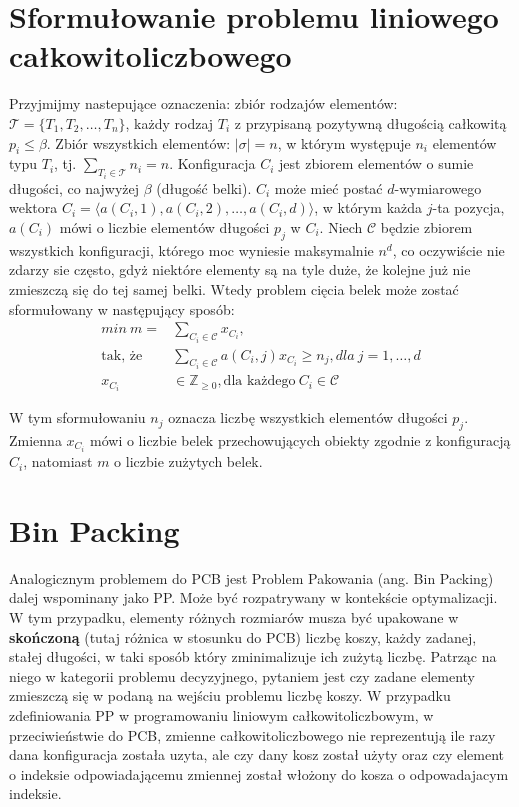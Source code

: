 \section{Sformułowanie problemu liniowego całkowitoliczbowego}
Przyjmijmy nastepujące oznaczenia: zbiór rodzajów elementów: $\mathcal{T} = \{T_1, T_2, \dots, T_n\}$, każdy rodzaj $T_i$ z przypisaną pozytywną długością całkowitą $p_i \leq \beta$. Zbiór wszystkich elementów: $|\mathcal{\sigma}| = n$, w którym występuje $n_i$ elementów typu $T_i$, tj. $\sum_{T_i \in \mathcal{T}} n_i = n$.
Konfiguracja $C_i$ jest zbiorem elementów o sumie długości, co najwyżej $\beta$ (długość belki). $C_i$ może mieć postać $d$-wymiarowego wektora $C_i = \langle a(C_i, 1), a(C_i,2), \dots, a(C_i,d)\rangle$, w którym każda $j$-ta pozycja, $a(C_i)$ mówi o liczbie elementów długości $p_j$ w $C_i$. Niech $\mathcal{C}$ będzie zbiorem wszystkich konfiguracji, którego moc wyniesie maksymalnie $n^d$, co oczywiście nie zdarzy sie często, gdyż niektóre elementy są na tyle duże, że kolejne już nie zmieszczą się do tej samej belki.
Wtedy problem cięcia belek może zostać sformułowany w następujący sposób:
\begin{align}
	min \ m =&\sum_{C_i \in \mathcal{C}} x_{C_i}, \\
	\text{tak, że} &\sum_{C_i \in \mathcal{C}} a(C_i,j)x_{C_i} \geq n_j, dla \ j = 1, \dots, d \\
	x_{C_i} &\in \mathbb{Z}_{\geq 0}, \text{dla każdego} \ C_i \in \mathcal{C} 
\end{align}

W tym sformułowaniu $n_j$ oznacza liczbę wszystkich elementów długości $p_j$. Zmienna $x_{C_i}$ mówi o liczbie belek przechowujących obiekty zgodnie z konfiguracją $C_i$, natomiast $m$ o liczbie zużytych belek.

\section{Bin Packing}
Analogicznym problemem do PCB jest Problem Pakowania (ang. Bin Packing) dalej wspominany jako PP.
Może być rozpatrywany w kontekście optymalizacji. W tym przypadku, elementy różnych rozmiarów musza być upakowane w \textbf{skończoną} (tutaj różnica w stosunku do PCB) liczbę koszy, każdy zadanej, stałej długości, w taki sposób który zminimalizuje ich zużytą liczbę. Patrząc na niego w kategorii problemu decyzyjnego, pytaniem jest czy zadane elementy zmieszczą się w podaną na wejściu problemu liczbę koszy.
W przypadku zdefiniowania PP w programowaniu liniowym całkowitoliczbowym, w przeciwieństwie do PCB, zmienne całkowitoliczbowego nie reprezentują ile razy dana konfiguracja została uzyta, ale czy dany kosz został użyty oraz czy element o indeksie odpowiadającemu zmiennej został włożony do kosza o odpowadajacym indeksie.

